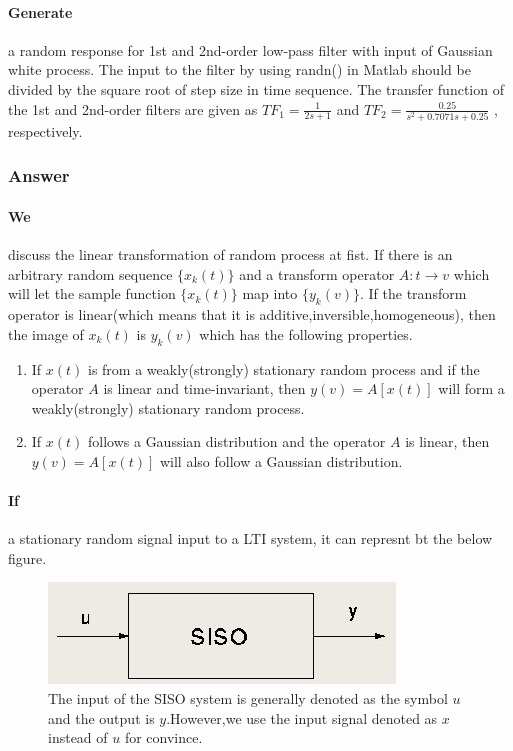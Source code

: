 \documentclass[12pt,a4paper]{article}
\begin{document}
			\paragraph{Generate}a random response for 1st and 2nd-order low-pass filter 
			with input of Gaussian white process. The input to the filter by 
			using randn() in Matlab should be divided by the square root of 
			step size in time sequence. The transfer function of the 1st and 
			2nd-order filters are given as $TF_{1}=\frac{1}{2s+1}$ and $TF_{2}=\frac{0.25}{s^{2}+0.7071s+0.25}$ , respectively.
		\subsubsection{Answer}
			\paragraph{We}discuss the linear transformation of random process at fist. If there is an arbitrary random sequence $\{x_{k}(t)\}$ and a transform operator $A:t \to v$ which will let the sample function $\{x_{k}(t)\}$ map into $\{y_{k}(v)\}$.
			If the transform operator is linear(which means that it is additive,inversible,homogeneous), then the image of $x_{k}(t)$ is $y_{k}(v)$  which has the following properties.
			\begin{enumerate}
				\item If $x(t)$ is from a weakly(strongly) stationary random process and if the operator $A$ is linear and time-invariant, then $y(v)=A[x(t)]$ will form a weakly(strongly) stationary random process.
				\item If $x(t)$ follows a Gaussian distribution and the operator $A$ is linear, then $y(v)=A[x(t)]$ will also follow a Gaussian distribution.
			\end{enumerate}
			\paragraph{If}a stationary random signal input to a LTI system, it can represnt bt the below figure. \\
			\begin{figure}[H]
				\centering
				\includegraphics[scale=1.0]{SISO}
				\caption[SISO system]{The input of the SISO system is generally denoted as the symbol $u$ and the output is $y.$However,we use the input signal denoted as $x$ instead of $u$ for convince.}
			\end{figure}
\end{document}
